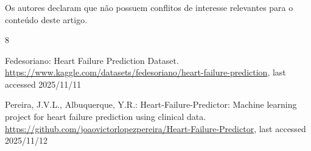 \documentclass[runningheads]{llncs}
\begin{document}



\begin{credits}
\subsubsection{\discintname}
Os autores declaram que não possuem conflitos de interesse relevantes para o conteúdo deste artigo.
\end{credits}
%
%
%
% 
% 
%
\begin{thebibliography}{8}

Fedesoriano:
Heart Failure Prediction Dataset.
\url{https://www.kaggle.com/datasets/fedesoriano/heart-failure-prediction},
last accessed 2025/11/11

Pereira, J.V.L., Albuquerque, Y.R.:
Heart-Failure-Predictor: Machine learning project for heart failure prediction using clinical data.
\url{https://github.com/joaovictorlopezpereira/Heart-Failure-Predictor},
last accessed 2025/11/12

\end{thebibliography}
\end{document}

